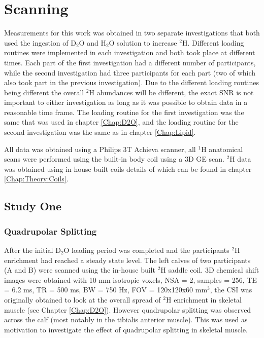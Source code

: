 \documentclass[class=article, crop=false]{standalone}
\begin{document}
\section{Scanning}

Measurements for this work was obtained in two separate investigations that both used the ingestion of D$_2$O and H$_2$O solution to increase $^2$H. Different loading routines were implemented in each investigation and both took place at different times. Each part of the first investigation had a different number of participants, while the second investigation had three participants for each part (two of which also took part in the previous investigation). Due to the different loading routines being different the overall $^2$H abundances will be different, the exact SNR is not important to either investigation as long as it was possible to obtain data in a reasonable time frame. The loading routine for the first investigation was the same that was used in chapter \ref{Chap:D2O}, and the loading routine for the second investigation was the same as in chapter \ref{Chap:Lipid}.

All data was obtained using a Philips 3T Achieva scanner, all $^1$H anatomical scans were performed using the built-in body coil using a 3D GE scan. $^2$H data was obtained using in-house built coils details of which can be found in chapter \ref{Chap:Theory:Coils}. 

\subsection{Study One}
\subsubsection{Quadrupolar Splitting}
\label{Chap:Quad:1:Split}

After the initial D$_2$O loading period was completed and the participants $^2$H enrichment had reached a steady state level. The left calves of two participants (A and B) were scanned using the in-house built $^2$H saddle coil. 3D chemical shift images were obtained with 10 mm isotropic voxels, NSA = 2, samples = 256, TE = 6.2 ms, TR = 500 ms, BW = 750 Hz, FOV = 120x120x60 mm$^3$, the CSI was originally obtained to look at the overall spread of $^2$H enrichment in skeletal muscle (see Chapter \ref{Chap:D2O}). However quadrupolar splitting was observed across the calf (most notably in the tibialis anterior muscle). This was used as motivation to investigate the effect of quadrupolar splitting in skeletal muscle.
\end{document}
